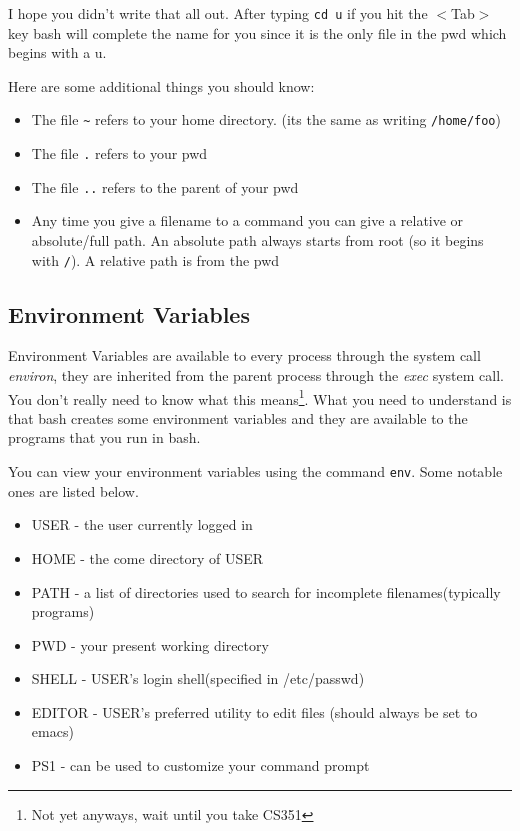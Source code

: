\documentclass[10pt]{article}
\begin{document}
  I hope you didn't write that all out. After typing \texttt{cd u} if you hit the $<$Tab$>$ key bash
  will complete the name for you since it is the only file in the pwd which begins with a u.

  Here are some additional things you should know:
  \begin{itemize}
    \item 
      The file \texttt{\~} refers to your home directory. (its the same as writing \texttt{/home/foo})
    \item 
      The file \texttt{.} refers to your pwd
    \item
      The file \texttt{..} refers to the parent of your pwd
    \item
      Any time you give a filename to a command you can give a relative or absolute/full path.
      An absolute path always starts from root (so it begins with \texttt{/}).
      A relative path is from the pwd
  \end{itemize}
  
  \subsection{Environment Variables}
  Environment Variables are available to every process through the system call \textit{environ}, they are inherited from the parent process through the \textit{exec} system call. You don't really need to know what this means\footnote{Not yet anyways, wait until you take CS351}. What you need to understand is that bash creates some environment variables and they are available to the programs that you run in bash. 

  You can view your environment variables using the command \texttt{env}. Some notable ones are listed below.

  \begin{itemize}
    \item
      USER - the user currently logged in
    \item
      HOME - the come directory of USER
    \item
      PATH - a list of directories used to search for incomplete filenames(typically programs)
    \item
      PWD  -  your present working directory
    \item
      SHELL - USER's login shell(specified in /etc/passwd)
    \item
      EDITOR - USER's preferred utility to edit files (should always be set to emacs)
    \item
      PS1   -  can be used to customize your command prompt
  \end{itemize}
\end{document}
